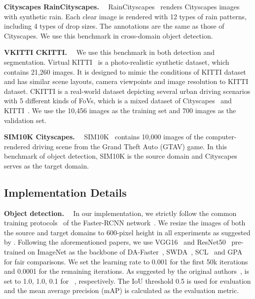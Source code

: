 \documentclass[10pt,journal,compsoc]{IEEEtran}
\renewcommand{\paragraph}[1]{\noindent\textbf{#1}~~}
\begin{document}
\paragraph{Cityscapes  RainCityscapes.} RainCityscapes~\cite{rainy_city} renders Cityscapes images with synthetic rain. Each clear image is rendered with 12 types of rain patterns, including 4 types of drop sizes. The annotations are the same as those of Cityscapes. We use this benchmark in cross-domain object detection.

\paragraph{VKITTI  CKITTI.}  We use this benchmark in both detection and segmentation. Virtual KITTI~\cite{VKITTI} is a photo-realistic synthetic dataset, which contains 21,260 images. 
It is designed to mimic the conditions of  KITTI dataset and 
has similar scene layouts, camera viewpoints and image resolution to KITTI dataset.
CKITTI is a real-world dataset depicting several urban driving scenarios with 5 different kinds of FoVs, which is a mixed dataset of Cityscapes~\cite{cordts2016cityscapes} and KITTI~\cite{kITTI}. We use the 10,456 images as the training set and 700 images as the validation set. 


\paragraph{SIM10K  Cityscapes.} SIM10K~\cite{sim10k} contains 10,000 images of the computer-rendered driving scene from the Grand Theft Auto (GTAV) game. In this benchmark of object detection, SIM10K is the source domain and Cityscapes~\cite{cordts2016cityscapes} serves as the target domain.



\subsection{Implementation Details}
\label{sec:implementation details}
\paragraph{Object detection.}
In our implementation, we strictly follow the common training protocols~\cite{DA-Faster-RCNN,SWDA,SCL,GPA} of the Faster-RCNN network~\cite{ren2016faster}. We resize the images of both the source and target domains to 600-pixel height in all experiments as suggested by \cite{DA-Faster-RCNN,SWDA,SCL}. Following the aforementioned papers, we use VGG16~\cite{vgg} and ResNet50~\cite{he2016deep} pre-trained on ImageNet \cite{deng2009imagenet} as the backbone of DA-Faster~\cite{DA-Faster-RCNN}, SWDA~\cite{SWDA}, SCL~\cite{SCL} and GPA~\cite{GPA} for fair comparisons. We set the learning rate to 0.001 for the first 50k iterations and 0.0001 for the remaining iterations.  As suggested by the original authors~\cite{DA-Faster-RCNN,SWDA,SCL},  is set to 1.0, 1.0, 0.1 for ~\cite{SCL,SWDA,DA-Faster-RCNN}, respectively.
The IoU threshold 0.5 is used for evaluation and the mean average precision (mAP) is calculated as the evaluation metric. 
\end{document}
